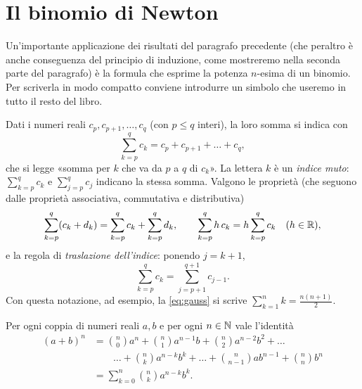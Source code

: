 \section{Il binomio di Newton}
\label{sec:binomio}

Un'importante applicazione dei risultati del paragrafo precedente (che peraltro è
anche conseguenza del principio di induzione, come mostreremo nella seconda parte del
paragrafo) è la formula che esprime la potenza $n$-esima di un binomio. Per scriverla in
modo compatto conviene introdurre un simbolo che useremo in tutto il resto del libro.

\begin{notazione}
Dati i numeri reali $c_{p},c_{p+1},\dots,c_{q}$ (con $p\le q$ interi), la loro somma si
indica con
\[
  \sum_{k=p}^{q}c_{k}=c_{p}+c_{p+1}+\dots+c_{q},
\]
che si legge «somma per $k$ che va da $p$ a $q$ di $c_{k}$». La lettera $k$ è un
\emph{indice muto}: $\sum_{k=p}^{q}c_{k}$ e $\sum_{j=p}^{q}c_{j}$ indicano la stessa
somma. Valgono le proprietà (che seguono dalle proprietà associativa, commutativa e
distributiva)
\[
  \sum_{k=p}^{q}(c_{k}+d_{k})=\sum_{k=p}^{q}c_{k}+\sum_{k=p}^{q}d_{k}, \qquad
  \sum_{k=p}^{q}h\,c_{k}=h\sum_{k=p}^{q}c_{k}\quad(h\in\mathbb{R}),
\]
e la regola di \emph{traslazione dell'indice}: ponendo $j=k+1$,
\begin{equation}\label{eq:traslazione-indice}
  \sum_{k=p}^{q}c_{k}=\sum_{j=p+1}^{q+1}c_{j-1}.
\end{equation}
Con questa notazione, ad esempio, la \eqref{eq:gauss} si scrive
$\sum_{k=1}^{n}k=\frac{n(n+1)}{2}$.
\end{notazione}

\begin{teorema}\label{teo:binomio}
Per ogni coppia di numeri reali $a,b$ e per ogni $n\in\mathbb{N}$ vale l'identità
\begin{equation}\label{eq:binomio}
\begin{split}
  (a+b)^{n}&=\binom n0a^{n}+\binom n1a^{n-1}b+\binom n2a^{n-2}b^{2}+\dots\\
  &\qquad\dots+\binom nk a^{n-k}b^{k}+\dots+\binom{n}{n-1}ab^{n-1}+\binom nn b^{n}\\
  &=\sum_{k=0}^{n}\binom nk a^{n-k}b^{k}.
\end{split}
\end{equation}
\end{teorema}

